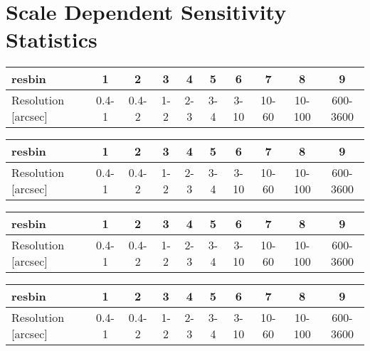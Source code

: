 \documentclass[sfheadings,a4paper,times,9pt,floats,floatfix]{article}
\begin{document}
\section{Scale Dependent Sensitivity Statistics}\label{app:all_decs}
\begin{landscape}
 \begin{table}[H]
  \begin{tabular}{|lccccccccc|}\hline
  resbin & 1 & 2 & 3 & 4 & 5 & 6 & 7 & 8 & 9 \\\hline
  Resolution [arcsec] & 0.4-1 & 0.4-2 & 1-2 & 2-3 & 3-4 & 3-10 & 10-60 & 10-100 & 600-3600 \\\hline
  \end{tabular}
 \end{table}
 
\end{landscape}
\begin{landscape}
 \begin{table}[H]
  \begin{tabular}{|lccccccccc|}\hline
  resbin & 1 & 2 & 3 & 4 & 5 & 6 & 7 & 8 & 9 \\\hline
  Resolution [arcsec] & 0.4-1 & 0.4-2 & 1-2 & 2-3 & 3-4 & 3-10 & 10-60 & 10-100 & 600-3600 \\\hline
  \end{tabular}
 \end{table}
 
\end{landscape}
\begin{landscape}
 \begin{table}[H]
  \begin{tabular}{|lccccccccc|}\hline
  resbin & 1 & 2 & 3 & 4 & 5 & 6 & 7 & 8 & 9 \\\hline
  Resolution [arcsec] & 0.4-1 & 0.4-2 & 1-2 & 2-3 & 3-4 & 3-10 & 10-60 & 10-100 & 600-3600 \\\hline
  \end{tabular}
 \end{table}
 
\end{landscape}
\begin{landscape}
 \begin{table}[H]
  \begin{tabular}{|lccccccccc|}\hline
  resbin & 1 & 2 & 3 & 4 & 5 & 6 & 7 & 8 & 9 \\\hline
  Resolution [arcsec] & 0.4-1 & 0.4-2 & 1-2 & 2-3 & 3-4 & 3-10 & 10-60 & 10-100 & 600-3600 \\\hline
  \end{tabular}
 \end{table}
 
\end{landscape}
\end{document}
